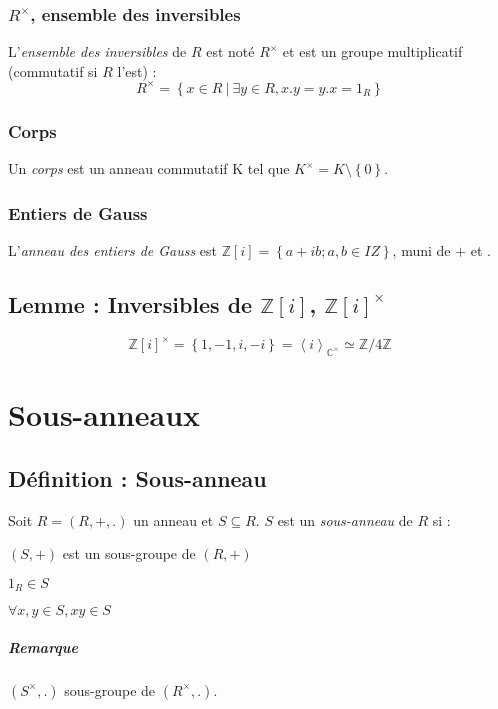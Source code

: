 \documentclass[reqno,a4paper,10pt]{report}
\makeatletter
\newcommand{\gen}[1]{\left\langle #1 \right\rangle} %
\newcommand{\set}[1]{\left\lbrace #1 \right\rbrace} %
\newcommand{\IZ}{\ensuremath{\mathbb{Z}}\xspace} %
\newcommand{\IC}{\ensuremath{\mathbb{C}}\xspace} %
\newcommand{\such}{\ | \ }
\let\olditemize=\itemize%
\renewenvironment{itemize}{%
    \olditemize%
  }{%
    \@noparlisttrue%
    \endlist%
  }%
\makeatother
\begin{document}
\subsection{$R^\times$, ensemble des inversibles}
L'\emph{ensemble des inversibles} de $R$ est noté $R^\times$ et est un groupe
multiplicatif (commutatif si $R$ l'est) :
\[R^\times = \set{x \in R \such \exists y \in R, x.y =y.x = 1_R}\]

\subsection{Corps}
Un \emph{corps} est un anneau commutatif K tel que $K^{\times} =
K\setminus\set{0}$.

\subsection{Entiers de Gauss}
L'\emph{anneau des entiers de Gauss} est $\IZ[i]=\set{a+ib; a, b \in IZ}$,
muni de $+$ et $.$

\section{Lemme : Inversibles de $\IZ[i]$, ${\IZ[i]}^\times$}
\[{\IZ[i]}^\times = \set{1,-1,i,-i} = \gen{i}_{\IC^\times} \simeq \IZ/4\IZ\]
 \begin{comment}
  preuve 17/09/09 p1
\end{comment}


\chapter{Sous-anneaux}
\section{Définition : Sous-anneau}
Soit $R=(R,+,.)$ un anneau et $S \subseteq R$. $S$ est un \emph{sous-anneau}
de $R$ si :
\begin{itemize}
  \item $(S,+)$ est un sous-groupe de $(R,+)$
  \item $1_R \in S$
  \item $\forall x,y \in S, xy \in S$
\end{itemize}

\paragraph{Remarque} $(S^\times, .)$ sous-groupe de $(R^\times, .)$.
\end{document}
